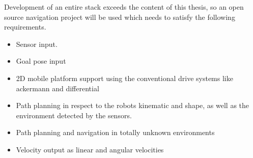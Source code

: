 Development of an entire stack exceeds the content of this thesis, so an open source navigation project will be used which needs to satisfy the following requirements.
\begin{itemize}
	\item Sensor input.
	\item Goal pose input
	\item 2D mobile platform support using the conventional drive systems like ackermann and differential
	\item Path planning in respect to the robots kinematic and shape, as well as the environment detected by the sensors.
	\item Path planning and navigation in totally unknown environments
	\item Velocity output as linear and angular velocities
\end{itemize}
